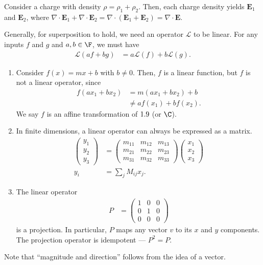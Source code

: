 \documentclass[10pt]{mypackage}
\begin{document}
Consider a charge with density $\rho = \rho_1 + \rho_2$. Then, each charge density yields $\mathbf{E}_1$ and $\mathbf{E}_2$, where $\nabla \cdot \mathbf{E}_1 + \nabla \cdot \mathbf{E}_2 = \nabla \cdot \left(\mathbf{E}_1 + \mathbf{E}_2\right) = \nabla \cdot \mathbf{E}$.\newline

Generally, for superposition to hold, we need an operator $\mathcal{L}$ to be linear. For any inputs $f$ and $g$ and $a,b\in \F$, we must have
\begin{align*}
  \mathcal{L}\left(af + bg\right) &= a\mathcal{L}\left(f\right) + b\mathcal{L}\left(g\right).
\end{align*}
\begin{example}
  \begin{enumerate}[(1)]
    \item Consider $f(x) = mx + b$ with $b\neq 0$. Then, $f$ is a linear function, but $f$ is not a linear operator, since
      \begin{align*}
        f\left(ax_1 + bx_2\right) &= m\left(ax_1 + bx_2\right) + b\\
                                  &\neq af\left(x_1\right) + bf\left(x_2\right).
      \end{align*}
      We say $f$ is an affine transformation of $1.9$ (or $\C$).
    \item In finite dimensions, a linear operator can always be expressed as a matrix.
      \begin{align*}
        \begin{pmatrix}y_1\\y_2\\y_3\end{pmatrix} &= \begin{pmatrix}m_{11} & m_{12} & m_{13} \\ m_{21} & m_{22} & m_{23} \\ m_{31} & m_{32} & m_{33}\end{pmatrix} \begin{pmatrix}x_1\\x_2\\x_3\end{pmatrix}\\
        y_{i} &= \sum_{j}M_{ij}x_j.
      \end{align*}
    \item The linear operator
      \begin{align*}
        P &= \begin{pmatrix}1 & 0 & 0 \\ 0 & 1 & 0 \\ 0 & 0 & 0\end{pmatrix}
      \end{align*}
      is a projection. In particular, $P$ maps any vector $v$ to its $x$ and $y$ components. The projection operator is idempotent --- $P^2 = P$.
  \end{enumerate}
\end{example}
Note that ``magnitude and direction'' follows from the idea of a vector.
\end{document}
